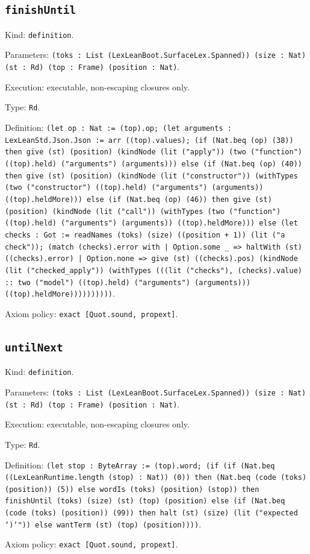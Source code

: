 \documentclass[11pt]{article}
\begin{document}
\subsection*{\texttt{finishUntil}}
\noindent Kind: \texttt{definition}.\par
\noindent Parameters: \texttt{(toks : List (LexLeanBoot.SurfaceLex.Spanned)) (size : Nat) (st : Rd) (top : Frame) (position : Nat)}.\par
\noindent Execution: executable, non-escaping closures only.\par
\noindent Type: \texttt{Rd}.\par
\noindent Definition: \texttt{(let op : Nat := (top).op; (let arguments : LexLeanStd.Json.Json := arr ((top).values); (if (Nat.beq (op) (38)) then give (st) (position) (kindNode (lit ("apply")) (two ("function") ((top).held) ("arguments") (arguments))) else (if (Nat.beq (op) (40)) then give (st) (position) (kindNode (lit ("constructor")) (withTypes (two ("constructor") ((top).held) ("arguments") (arguments)) ((top).heldMore))) else (if (Nat.beq (op) (46)) then give (st) (position) (kindNode (lit ("call")) (withTypes (two ("function") ((top).held) ("arguments") (arguments)) ((top).heldMore))) else (let checks : Got := readNames (toks) (size) ((position + 1)) (lit ("a check")); (match (checks).error with | Option.some \_ => haltWith (st) ((checks).error) | Option.none => give (st) ((checks).pos) (kindNode (lit ("checked\_apply")) (withTypes (((lit ("checks"), (checks).value) :: two ("model") ((top).held) ("arguments") (arguments))) ((top).heldMore))))))))))}.\par
\noindent Axiom policy: \texttt{exact [Quot.sound, propext]}.\par
\subsection*{\texttt{untilNext}}
\noindent Kind: \texttt{definition}.\par
\noindent Parameters: \texttt{(toks : List (LexLeanBoot.SurfaceLex.Spanned)) (size : Nat) (st : Rd) (top : Frame) (position : Nat)}.\par
\noindent Execution: executable, non-escaping closures only.\par
\noindent Type: \texttt{Rd}.\par
\noindent Definition: \texttt{(let stop : ByteArray := (top).word; (if (if (Nat.beq ((LexLeanRuntime.length (stop) : Nat)) (0)) then (Nat.beq (code (toks) (position)) (5)) else wordIs (toks) (position) (stop)) then finishUntil (toks) (size) (st) (top) (position) else (if (Nat.beq (code (toks) (position)) (99)) then halt (st) (size) (lit ("expected `)`")) else wantTerm (st) (top) (position))))}.\par
\noindent Axiom policy: \texttt{exact [Quot.sound, propext]}.\par
\end{document}
